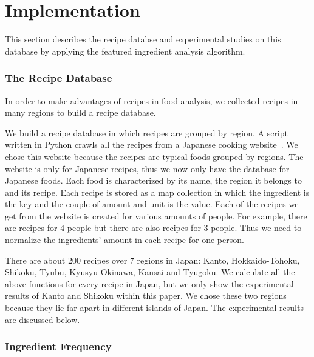 \chapter{Implementation}\label{chap:implementation}
This section describes the recipe databse and experimental studies on this database by applying the featured ingredient analysis algorithm.  

\subsection{The Recipe Database}
In order to make advantages of recipes in food analysis, we collected recipes in many regions to build a recipe database. 

We build a recipe database in which recipes are grouped by region. A script written in Python crawls all the recipes from a Japanese cooking website~\cite{web:recipe}. We chose this website because the recipes are typical foods grouped by regions. The website is only for Japanese recipes, thus we now only have the database for Japanese foods. Each food is characterized by its name, the region it belongs to and its recipe. Each recipe is stored as a map collection in which the ingredient is the key and the couple of amount and unit is the value. Each of the recipes we get from the website is created for various amounts of people. For example, there are recipes for 4 people but there are also recipes for 3 people. Thus we need to normalize the ingredients' amount in each recipe for one person.

\par There are about 200 recipes over 7 regions in Japan: Kanto, Hokkaido-Tohoku, Shikoku, Tyubu, Kyusyu-Okinawa, Kansai and Tyugoku. We calculate all the above functions for every recipe in Japan, but we only show the experimental results of Kanto and Shikoku within this paper. We chose these two regions because they lie far apart in different islands of Japan. The experimental results are discussed below. 

\subsection{Ingredient Frequency}

